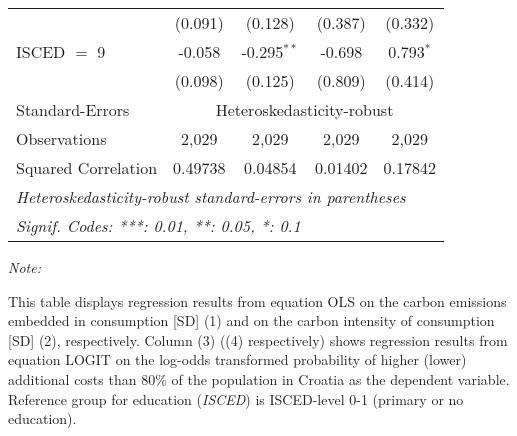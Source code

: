\begin{table}[htbp!]
\begin{adjustbox}{width = 1\textwidth, max height = 0.95\textheight, center}
\begin{threeparttable}[b]
\begin{tabular}{lcccc}
                                 & (0.091)            & (0.128)            & (0.387)       & (0.332)\\   
            ISCED $=$ 9          & -0.058             & -0.295$^{**}$      & -0.698        & 0.793$^{*}$\\   
                                 & (0.098)            & (0.125)            & (0.809)       & (0.414)\\   
            \midrule 
            Standard-Errors & \multicolumn{4}{c}{Heteroskedasticity-robust} \\ 
            Observations         & 2,029              & 2,029              & 2,029         & 2,029\\  
            Squared Correlation  & 0.49738            & 0.04854            & 0.01402       & 0.17842\\  
            \midrule \midrule
            \multicolumn{5}{l}{\emph{Heteroskedasticity-robust standard-errors in parentheses}}\\
            \multicolumn{5}{l}{\emph{Signif. Codes: ***: 0.01, **: 0.05, *: 0.1}}\\
         \end{tabular}
         
         \begin{tablenotes}\item \medskip \textit{Note:}
            \item This table displays regression results from equation OLS on the carbon emissions embedded in consumption [SD] (1) and on the carbon intensity of consumption [SD] (2), respectively. 
                                      Column (3) ((4) respectively) shows regression results from equation LOGIT on the log-odds transformed probability of higher (lower) additional costs than 80\% of the population in Croatia as the dependent variable. Reference group for education (\textit{ISCED}) is ISCED-level 0-1 (primary or no education).
         \end{tablenotes}
      \end{threeparttable}
   \end{adjustbox}
\end{table}


